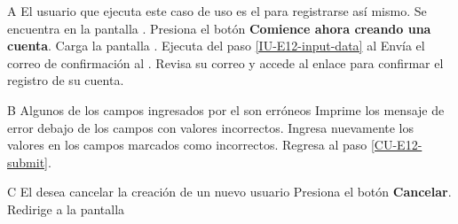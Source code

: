 \begin{UCtrayectoriaA}{A}{%
El usuario que ejecuta este caso de uso es el  para registrarse
así mismo.
}
  \Actor Se encuentra en la pantalla . 
  \Actor Presiona el botón {\bf Comience ahora creando una cuenta}.
  \Sistema Carga la pantalla .
  \Sistema Ejecuta del paso \ref{IU-E12-input-data} al
  \Sistema Envía el correo de confirmación al . 
  \Actor Revisa su correo y accede al enlace para confirmar el registro de su cuenta.
\end{UCtrayectoriaA}

\begin{UCtrayectoriaA}{B}{%
Algunos de los campos ingresados por el  son erróneos
}
  \Sistema Imprime los mensaje de error debajo de los campos con valores incorrectos.
  \Actor Ingresa nuevamente los valores en los campos marcados como incorrectos.
  \Sistema Regresa al paso \ref{CU-E12-submit}.
\end{UCtrayectoriaA}


\begin{UCtrayectoriaA}{C}{%
El  desea cancelar la creación de un nuevo usuario
}
  \Actor Presiona el botón {\bf Cancelar}.
  \Sistema Redirige a la pantalla 
\end{UCtrayectoriaA}
